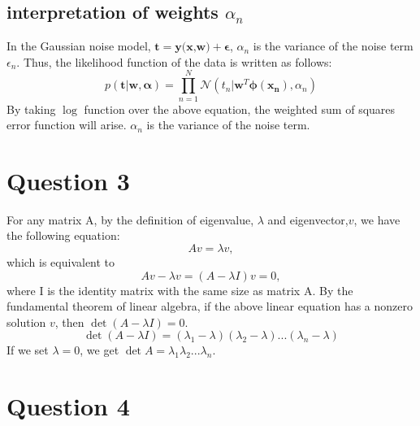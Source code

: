 \documentclass[paper=a4, fontsize=11pt]{article} %
\begin{document}
\subsection{interpretation of weights $\alpha_n$}
In the Gaussian noise model, $\textbf{t} = \textbf{y(x,w)} + \boldsymbol{\epsilon}$,
$\alpha_n$ is the variance of the noise term $\epsilon_n$.
Thus, the likelihood function of the data is written as follows:
\begin{equation}
p( \boldsymbol{t} |\boldsymbol{w}, \boldsymbol{\alpha}) 
=
\prod_{n=1}^N \mathcal{N} (t_n|\boldsymbol{w}^T \boldsymbol{\phi(x_n)}, \alpha_n) 
\end{equation}
By taking $\log$ function over the above equation, the weighted sum of squares error function will arise.
$\alpha_n$ is the variance of the noise term.


\section{Question 3}
For any matrix A, by the definition of eigenvalue, $\lambda$ and eigenvector,$v$, we have the following equation:
\begin{equation}
A v = \lambda v,
\end{equation}
which is equivalent to 
\begin{equation}
A v - \lambda v = (A - \lambda I)v = 0,
\end{equation}
where I is the identity matrix with the same size as matrix A. 
By the fundamental theorem of linear algebra, if the above linear equation has a nonzero solution $v$, then $\det(A- \lambda I)  =0$.
\begin{equation}
\det(A- \lambda I)  = (\lambda_1 - \lambda)(\lambda_2 - \lambda)...(\lambda_n - \lambda)
\end{equation}
If we set $\lambda =0$, we get $\det A = \lambda_1 \lambda_2...\lambda_n$.




\section{Question 4}
\end{document}
